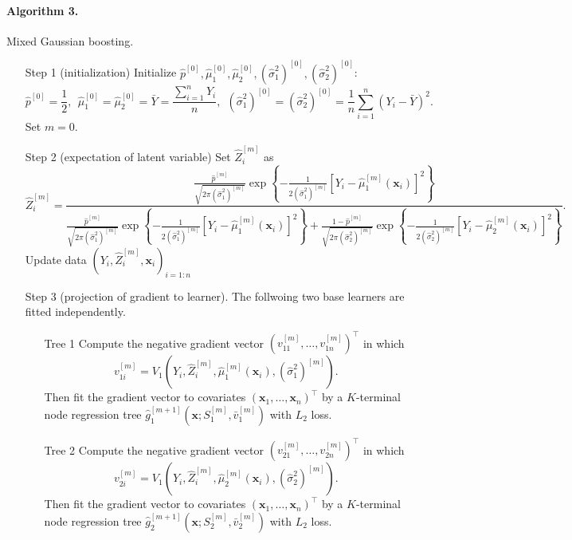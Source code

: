 \documentclass[11pt]{article}
\numberwithin{equation}{section}
\def\bx{\boldsymbol{x}}
\begin{document}
\paragraph{Algorithm 3.} Mixed Gaussian boosting.
\begin{itemize}
	\item[Step 1] (initialization)  Initialize $\hat{p}^{[0]}, \hat{\mu}_1^{[0]}, \hat{\mu}_2^{[0]}, (\hat{\sigma}_1^2)^{[0]},(\hat{\sigma}_2^2)^{[0]}$:
	$$\hat{p}^{[0]}=\frac{1}{2},~~ \hat{\mu}_1^{[0]}=\hat{\mu}_2^{[0]}=\bar{Y}=\frac{\sum_{i=1}^nY_i}{n},~~
	(\hat{\sigma}_1^2)^{[0]}=(\hat{\sigma}_2^2)^{[0]}=\frac{1}{n}\sum_{i=1}^n (Y_i-\bar{Y})^2.$$
	Set $m=0$.
	
	\item[Step 2] (expectation of latent variable) Set $\hat{Z}_i^{[m]}$ as 
	$$\hat{Z}_i^{[m]}=\frac{\frac{\hat{p}^{[m]}}{\sqrt{2\pi (\hat{\sigma}_1^2)^{[m]}}}\exp\left\{-\frac{1}{2(\hat{\sigma}_1^2)^{[m]}}[Y_i-\hat{\mu}_1^{[m]}(\bx_i)]^2\right\}}{\frac{\hat{p}^{[m]}}{\sqrt{2\pi (\hat{\sigma}_1^2)^{[m]}}}\exp\left\{-\frac{1}{2(\hat{\sigma}_1^2)^{[m]}}[Y_i-\hat{\mu}_1^{[m]}(\bx_i)]^2\right\}+\frac{1-\hat{p}^{[m]}}{\sqrt{2\pi (\hat{\sigma}_2^2)^{[m]}}}\exp\left\{-\frac{1}{2(\hat{\sigma}_2^2)^{[m]}}[Y_i-\hat{\mu}_2^{[m]}(\bx_i)]^2\right\}}.$$
	Update data $(Y_i,\hat{Z}_i^{[m]},\bx_i)_{i=1:n}$ 
	
	\item[Step 3] (projection of gradient to learner). The follwoing two base learners  are fitted independently. 
	\begin{itemize}
		\item[Tree 1] Compute the negative gradient vector $(v_{11}^{[m]},\ldots,v_{1n}^{[m]})^\top$ in which 
		$$v_{1i}^{[m]}=V_1(Y_i,\hat{Z}_i^{[m]},\hat{\mu}_1^{[m]}(\bx_i),(\hat{\sigma}_1^2)^{[m]}).$$
		Then fit the gradient vector to covariates $(\bx_1,\ldots,\bx_n)^\top$ by a $K$-terminal node regression tree $\hat{g}_1^{[m+1]}\left(\bx;S_1^{[m]},\bar{v}_1^{[m]}\right)$ with $L_2$ loss.
		
		\item[Tree 2] Compute the negative gradient vector $(v_{21}^{[m]},\ldots,v_{2n}^{[m]})^\top$ in which 
		$$v_{2i}^{[m]}=V_1(Y_i,\hat{Z}_i^{[m]},\hat{\mu}_2^{[m]}(\bx_i),(\hat{\sigma}_2^2)^{[m]}).$$
		Then fit the gradient vector to covariates $(\bx_1,\ldots,\bx_n)^\top$ by a $K$-terminal node regression tree $\hat{g}_2^{[m+1]}\left(\bx;S_2^{[m]},\bar{v}_2^{[m]}\right)$ with $L_2$ loss.
		

\end{itemize}
\end{itemize}
\end{document}
